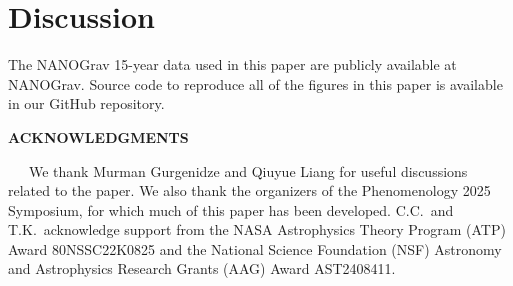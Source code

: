 \documentclass[prd,aps,psfig,nofootinbib,nobibnotes,superscriptaddress,preprintnumbers,times]{revtex4-2}\setlength{\topmargin}{-14mm}
\begin{document}
\section{Discussion}\label{sec:discussion}


\vspace{3mm}
The NANOGrav 15-year data used in this paper are publicly available at NANOGrav. Source code to reproduce all of the figures in this paper is available in our GitHub repository.

\begin{center}
    \textbf{ACKNOWLEDGMENTS}    
\end{center}
\ \ \ We thank Murman Gurgenidze and Qiuyue Liang for useful discussions related to the paper. We also thank the organizers of the Phenomenology 2025 Symposium, for which much of this paper has been developed. C.C.\ and T.K.\ acknowledge support from the NASA Astrophysics Theory Program (ATP) Award 80NSSC22K0825 and the National Science Foundation (NSF) Astronomy and Astrophysics Research Grants (AAG) Award AST2408411.




\clearpage
\end{document}
